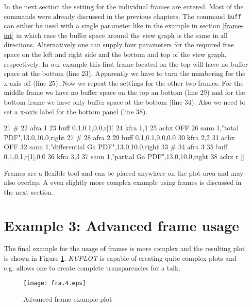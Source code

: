 In the next section the setting for the individual frames are
entered. Most of the commands were already discussed in the previous
chapters. The command {\tt buff} can either be used with a single
parameter like in the example in section \ref{frame-int} in which
case the buffer space around the view graph is the same in all
directions. Alternatively one can supply four parameters for the
required free space on the left and right side and the bottom and
top of the view graph, respectively. In our example this first frame
located on the top will have no buffer space at the bottom (line
23). Apparently we have to turn the numbering for the x-axis off
(line 25). Now we repeat the settings for the other two frames. For
the middle frame we have no buffer space on the top an bottom (line
29) and for the bottom frame we have only buffer space at the bottom
(line 34). Also we need to set a x-axis label for the bottom panel
(line 38).

\begin{MacVerbatim}
     21  #
     22  afra 1
     23  buff 0.1,0.1,0.0,r[1]
     24  kfra 1,1
     25  achx OFF
     26  sann 1,"total PDF",13.0,10.0,right
     27  #
     28  afra 2
     29  buff 0.1,0.1,0.0,0.0
     30  kfra 2,2
     31  achx OFF
     32  sann 1,"differential Ga PDF",13.0,10.0,right
     33  #
     34  afra 3
     35  buff 0.1,0.1,r[1],0.0
     36  kfra 3,3
     37  sann 1,"partial Ga PDF",13.0,10.0,right
     38  achx r [\A]
\end{MacVerbatim}

Frames are a flexible tool and can be placed anywhere on the plot
area and may also overlap. A even slightly more complex example using
frames is discussed in the next section.


\section{Example 3: Advanced frame usage \label{frame-exa3}}

The final example for the usage of frames is more complex and the
resulting plot is shown in Figure \ref{fra-fig4}. {\it KUPLOT} is
capable of creating quite complex plots and e.g. allows one to create
complete transparencies for a talk.

\begin{figure}[!p]
   \centering
   \texttt{[image: fra.4.eps]}
   \caption{Advanced frame example plot}
   \label{fra-fig4}
\end{figure}

